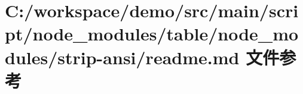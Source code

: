 \hypertarget{node__modules_2table_2node__modules_2strip-ansi_2_r_e_a_d_m_e_8md}{}\section{C\+:/workspace/demo/src/main/script/node\+\_\+modules/table/node\+\_\+modules/strip-\/ansi/readme.md 文件参考}
\label{node__modules_2table_2node__modules_2strip-ansi_2_r_e_a_d_m_e_8md}
